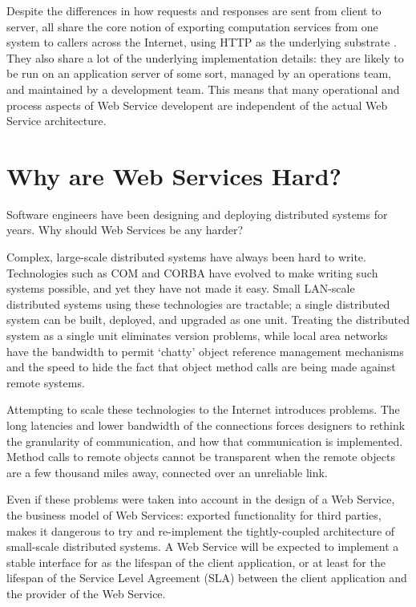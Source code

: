 \documentclass[draft]{report}
\begin{document}
Despite the differences in how requests and responses are sent from
client to server, all share the core notion of exporting computation
services from one system to callers across the Internet, using HTTP as
the underlying substrate \cite{ietf:rfc2616}. They also share a lot of
the underlying implementation details: they are likely to be run on an
application server of some sort, managed by an operations team, and
maintained by a development team. This means that many operational and
process aspects of Web Service developent are independent of the actual
Web Service architecture.

\section{Why are Web Services Hard?}

Software engineers have been designing and deploying distributed systems
for years. Why should Web Services be any harder?

Complex, large-scale distributed systems have always been hard to write.
Technologies such as COM and CORBA have evolved to make writing such
systems possible, and yet they have not made it easy. Small LAN-scale
distributed systems using these technologies are tractable; a single
distributed system can be built, deployed, and upgraded as one unit.
Treating the distributed system as a single unit eliminates version
problems, while local area networks have the bandwidth to permit
`chatty' object reference management mechanisms and the speed to hide
the fact that object method calls are being made against remote systems.


Attempting to scale these technologies to the Internet introduces
problems. The long latencies and lower bandwidth of the connections
forces designers to rethink the granularity of communication, and how
that communication is implemented. Method calls to remote objects cannot
be transparent when the remote objects are a few thousand miles away,
connected over an unreliable link.

Even if these problems were taken into account in the design of a Web
Service, the business model of Web Services: exported functionality for
third parties, makes it dangerous to try and re-implement the
tightly-coupled architecture of small-scale distributed systems. A Web
Service will be expected to implement a stable interface for as the
lifespan of the client application, or at least for the lifespan of the
Service Level Agreement (SLA) between the client application and the
provider of the Web Service.
\end{document}
